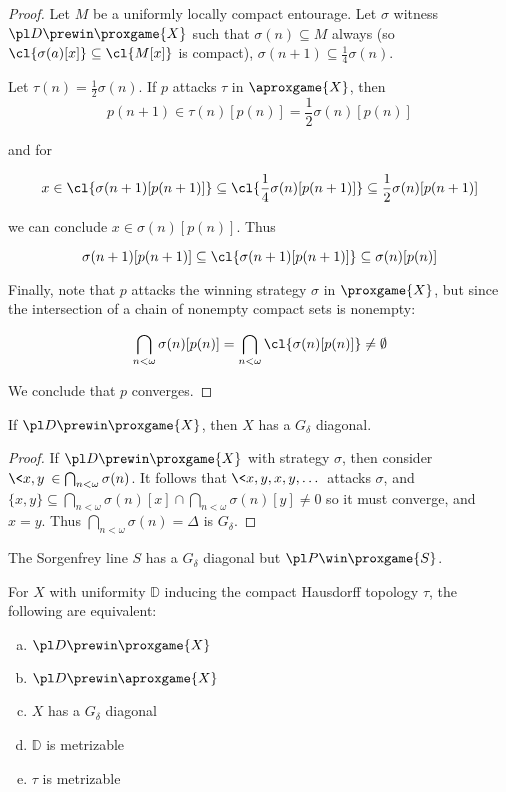 \begin{proof}
  Let $M$ be a uniformly locally compact entourage. 
  Let $\sigma$ witness $\pl D\prewin \proxgame{X}$ such that 
  $\sigma(n)\subseteq M$ always 
  (so $\cl{\sigma(a)[x]}\subseteq\cl{M[x]}$ is compact), 
  $\sigma(n+1)\subseteq\frac{1}{4}\sigma(n)$.

  Let $\tau(n)=\frac{1}{2}\sigma(n)$. If $p$ attacks $\tau$ in 
  $\aproxgame{X}$, then
    \[
      p(n+1)
        \in
      \tau(n)[p(n)]
        =
      \frac{1}{2}\sigma(n)[p(n)]
    \]

    and for

    \[
      x
        \in
      \cl{\sigma(n+1)[p(n+1)]}
        \subseteq
      \cl{\frac{1}{4}\sigma(n)[p(n+1)]}
        \subseteq
      \frac{1}{2}\sigma(n)[p(n+1)]
    \]

  we can conclude $x\in\sigma(n)[p(n)]$. Thus

    \[
      \sigma(n+1)[p(n+1)]
        \subseteq
      \cl{\sigma(n+1)[p(n+1)]}
        \subseteq
      \sigma(n)[p(n)]
    \]

  Finally, note that $p$ attacks the winning strategy $\sigma$ in 
  $\proxgame{X}$, but since the intersection of a chain of nonempty compact 
  sets is nonempty:

    \[
      \bigcap_{n<\omega} \sigma(n)[p(n)]
        =
      \bigcap_{n<\omega} \cl{\sigma(n)[p(n)]}
        \not=
      \emptyset
    \]

  We conclude that $p$ converges.
\end{proof}

\begin{prop}
If $\pl D \prewin \proxgame{X}$, then $X$ has a $G_\delta$ diagonal.
\end{prop}

\begin{proof}
  If $\pl D \prewin \proxgame{X}$ with strategy $\sigma$, then consider 
  $\<x,y\>\in \bigcap_{n<\omega} \sigma(n)$. It follows that 
  $\<x,y,x,y,\dots\>$ attacks $\sigma$, and 
    $
      \{x,y\}\subseteq \bigcap_{n<\omega} 
      \sigma(n)[x]\cap\bigcap_{n<\omega}\sigma(n)[y]
      \not=0
    $ 
  so it must converge, and $x=y$. Thus
  $\bigcap_{n<\omega}\sigma(n) = \Delta$ is $G_\delta$.
\end{proof}

\begin{ex}
The Sorgenfrey line $S$ has a $G_\delta$ diagonal but $\pl P\win\proxgame{S}$.
\end{ex}

\begin{cor}
  For $X$ with uniformity $\mathbb{D}$ inducing the compact Hausdorff topology 
  $\tau$, the following are equivalent:
    \begin{enumerate}[(a)]
      \item $\pl D \prewin \proxgame{X}$
      \item $\pl D \prewin \aproxgame{X}$
      \item $X$ has a $G_\delta$ diagonal
      \item $\mathbb{D}$ is metrizable
      \item $\tau$ is metrizable
    \end{enumerate}
\end{cor}

